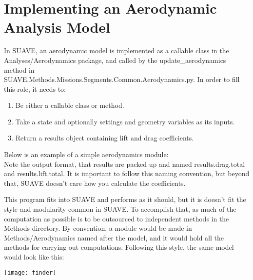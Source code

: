 \documentclass[11pt, oneside]{article}   	%
\begin{document}
\section{Implementing an Aerodynamic Analysis Model}
In SUAVE, an aerodynamic model is implemented as a callable class in the Analyses/Aerodynamics package, and called by the update\_aerodynamics method in \\SUAVE.Methods.Missions.Segments.Common.Aerodynamics.py.  In order to fill this role, it needs to:
\begin{enumerate}
\item Be either a callable class or method.
\item Take a state and optionally settings and geometry variables as its inputs.
\item Return a results object containing lift and drag coefficients.
\end{enumerate}
Below is an example of a simple aerodynamics module:\\

Note the output format, that results are packed up and named results.drag.total and results.lift.total.  It is important to follow this naming convention, but beyond that, SUAVE doesn't care how you calculate the coefficients.
\par This program fits into SUAVE and performs as it should, but it is doesn't fit the style and modularity common in SUAVE.  To accomplish that, as much of the computation as possible is to be outsourced to independent methods in the Methods directory.  By convention, a module would be made in Methods/Aerodynamics named after the model, and it would hold all the methods for carrying out computations.  Following this style, the same model would look like this:\\

\begin{center}\texttt{[image: finder]}\end{center}


\end{document}
